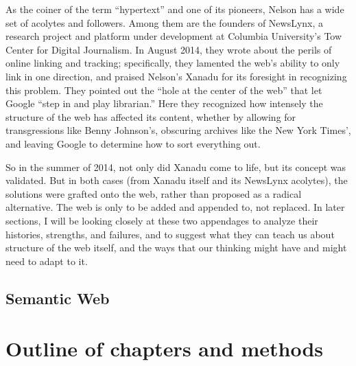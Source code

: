 As the coiner of the term ``hypertext'' and one of its pioneers, Nelson has a wide set of acolytes and followers. Among them are the founders of NewsLynx, a research project and platform under development at Columbia University's Tow Center for Digital Journalism. In August 2014, they wrote about the perils of online linking and tracking; specifically, they lamented the web's ability to only link in one direction, and praised Nelson's Xanadu for its foresight in recognizing this problem. They pointed out the ``hole at the center of the web'' that let Google ``step in and play librarian.'' Here they recognized how intensely the structure of the web has affected its content, whether by allowing for transgressions like Benny Johnson's, obscuring archives like the New York Times', and leaving Google to determine how to sort everything out.

So in the summer of 2014, not only did Xanadu come to life, but its concept was validated. But in both cases (from Xanadu itself and its NewsLynx acolytes), the solutions were grafted onto the web, rather than proposed as a radical alternative. The web is only to be added and appended to, not replaced. In later sections, I will be looking closely at these two appendages to analyze their histories, strengths, and failures, and to suggest what they can teach us about structure of the web itself, and the ways that our thinking might have and might need to adapt to it.

\subsection{Semantic Web}

\section{Outline of chapters and methods}
